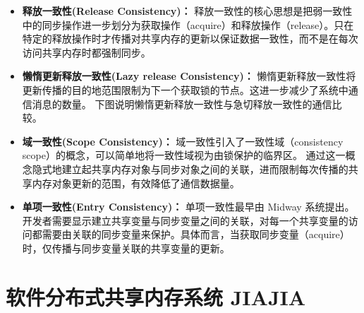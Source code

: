 {\begin{itemize}
\begin{figure}[!htbp]
                  \label{fig:oaspl}
              \end{figure}

        \item \textbf{释放一致性(Release Consistency)：} 释放一致性的核心思想是把弱一致性中的同步操作进一步划分为获取操作（acquire）和释放操作（release）。只在特定的释放操作时才传播对共享内存的更新以保证数据一致性，而不是在每次访问共享内存时都强制同步。

        \item \textbf{懒惰更新释放一致性(Lazy release Consistency)：} 懒惰更新释放一致性将更新传播的目的地范围限制为下一个获取锁的节点。这进一步减少了系统中通信消息的数量。
              下图说明懒惰更新释放一致性与急切释放一致性的通信比较。

        \item \textbf{域一致性(Scope Consistency)：} 域一致性引入了一致性域（consistency scope）的概念，可以简单地将一致性域视为由锁保护的临界区。
              通过这一概念隐式地建立起共享内存对象与同步对象之间的关联，进而限制每次传播的共享内存对象更新的范围，有效降低了通信数据量。

        \item \textbf{单项一致性(Entry Consistency)：} 单项一致性最早由 Midway 系统提出。开发者需要显示建立共享变量与同步变量之间的关联，对每一个共享变量的访问都需要由关联的同步变量来保护。具体而言，当获取同步变量（acquire）时，仅传播与同步变量关联的共享变量的更新。
    \end{itemize}

    \section{软件分布式共享内存系统 JIAJIA}
}
